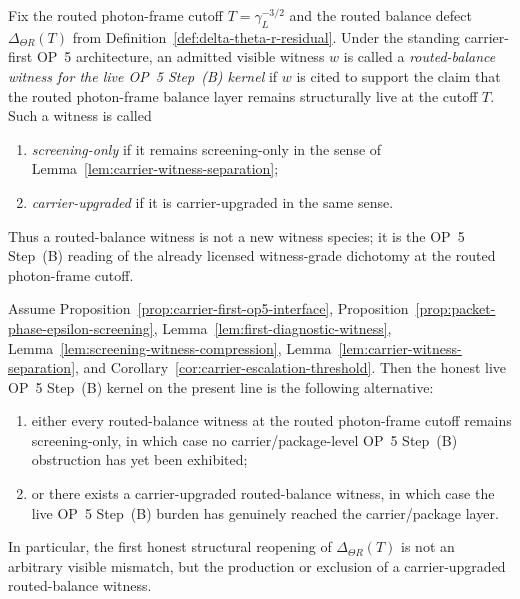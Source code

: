 \begin{definition}
\label{def:routed-balance-witness-live-op5b-kernel}
Fix the routed photon-frame cutoff \(T=\gamma_L^{-3/2}\) and the routed balance defect \(\Delta_{\Theta R}(T)\) from Definition~\ref{def:delta-theta-r-residual}. Under the standing carrier-first OP~5 architecture, an admitted visible witness \(w\) is called a \emph{routed-balance witness for the live OP~5 Step~(B) kernel} if \(w\) is cited to support the claim that the routed photon-frame balance layer remains structurally live at the cutoff \(T\). Such a witness is called
\begin{enumerate}[leftmargin=2em]
 \item \emph{screening-only} if it remains screening-only in the sense of Lemma~\ref{lem:carrier-witness-separation};
 \item \emph{carrier-upgraded} if it is carrier-upgraded in the same sense.
\end{enumerate}
Thus a routed-balance witness is not a new witness species; it is the OP~5 Step~(B) reading of the already licensed witness-grade dichotomy at the routed photon-frame cutoff.
\end{definition}

\begin{proposition}
\label{prop:live-op5b-kernel-carrier-upgraded-witness-problem}
Assume Proposition~\ref{prop:carrier-first-op5-interface}, Proposition~\ref{prop:packet-phase-epsilon-screening}, Lemma~\ref{lem:first-diagnostic-witness}, Lemma~\ref{lem:screening-witness-compression}, Lemma~\ref{lem:carrier-witness-separation}, and Corollary~\ref{cor:carrier-escalation-threshold}. Then the honest live OP~5 Step~(B) kernel on the present line is the following alternative:
\begin{enumerate}[leftmargin=2em,label=(\roman*)]
 \item either every routed-balance witness at the routed photon-frame cutoff remains screening-only, in which case no carrier/package-level OP~5 Step~(B) obstruction has yet been exhibited;
 \item or there exists a carrier-upgraded routed-balance witness, in which case the live OP~5 Step~(B) burden has genuinely reached the carrier/package layer.
\end{enumerate}
In particular, the first honest structural reopening of \(\Delta_{\Theta R}(T)\) is not an arbitrary visible mismatch, but the production or exclusion of a carrier-upgraded routed-balance witness.
\end{proposition}

